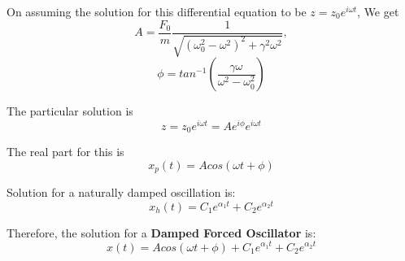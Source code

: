 \documentclass[12pt]{article}
\begin{document}
On assuming the solution for this differential equation to be $z = z_0 e^{i\omega t}$, We get 
\begin{equation*}
	A = \frac{F_0}{m} \frac{1}{\sqrt{ \left( \omega_0^2 - \omega^2 \right)^2 + \gamma^2\omega^2 }},
\end{equation*}
\begin{equation*}
	\phi = tan^{-1} \left( \frac{\gamma\omega}{\omega^2 - \omega_0^2} \right)
\end{equation*}

The particular solution is
\begin{equation*}
	z = z_0 e^{i\omega t} = A e^{i\phi} e^{i\omega t}
\end{equation*}

The real part for this is
\begin{equation*}
	x_p(t) = A cos \left( \omega t + \phi \right)
\end{equation*}

Solution for a naturally damped oscillation is:
\begin{equation*}
	x_h(t) = C_1 e^{\alpha_1 t} + C_2 e^{\alpha_2 t}
\end{equation*}

Therefore, the solution for a \textbf{Damped Forced Oscillator} is:
\begin{equation*}
	x(t) = A cos \left( \omega t + \phi \right) + C_1 e^{\alpha_1 t} + C_2 e^{\alpha_2 t}
\end{equation*}
\end{document}
